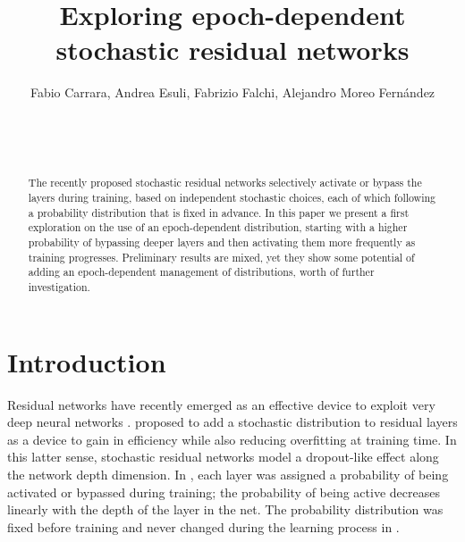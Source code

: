 \documentclass{sig-alternate}
\begin{document}


\doi{}

\isbn{}


\title{Exploring epoch-dependent stochastic residual networks}

\author{
\alignauthor
Fabio Carrara, Andrea Esuli, Fabrizio Falchi, Alejandro Moreo Fern\'andez\\
       \\
       \\
       \\
}


\maketitle
\begin{abstract}
The recently proposed stochastic residual networks selectively activate or bypass the layers during training, based on independent stochastic choices, each of which following a probability distribution that is fixed in advance.
In this paper we present a first exploration on the use of an epoch-dependent distribution, starting with a higher probability of bypassing deeper layers and then activating them more frequently as training progresses.
Preliminary results are mixed, yet they show some potential of adding an epoch-dependent management of distributions, worth of further investigation.
\end{abstract}



\printccsdesc



\section{Introduction}
Residual networks have recently emerged as an effective device to exploit very deep neural networks \cite{he2015deep}.
\cite{huang2016deep} proposed to add a stochastic distribution to residual layers as a device to gain in efficiency while also reducing overfitting at training time.
In this latter sense, stochastic residual networks model a dropout-like effect along the network depth dimension.
In \cite{huang2016deep}, each layer was assigned a probability of being activated or bypassed during training; the probability of being active decreases linearly with the depth of the layer in the net.
The probability distribution was fixed before training and never changed during the learning process in \cite{huang2016deep}.
\end{document}
